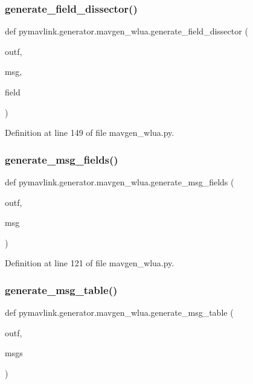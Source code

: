\subsubsection{\texorpdfstring{generate\_field\_dissector()}{generate\_field\_dissector()}}
{\footnotesize\ttfamily def pymavlink.\+generator.\+mavgen\+\_\+wlua.\+generate\+\_\+field\+\_\+dissector (\begin{DoxyParamCaption}\item[{}]{outf,  }\item[{}]{msg,  }\item[{}]{field }\end{DoxyParamCaption})}



Definition at line 149 of file mavgen\+\_\+wlua.\+py.

\mbox{\label{namespacepymavlink_1_1generator_1_1mavgen__wlua_a5a9d333c1ab8267705564a52bc232871}} 
\subsubsection{\texorpdfstring{generate\_msg\_fields()}{generate\_msg\_fields()}}
{\footnotesize\ttfamily def pymavlink.\+generator.\+mavgen\+\_\+wlua.\+generate\+\_\+msg\+\_\+fields (\begin{DoxyParamCaption}\item[{}]{outf,  }\item[{}]{msg }\end{DoxyParamCaption})}



Definition at line 121 of file mavgen\+\_\+wlua.\+py.

\mbox{\label{namespacepymavlink_1_1generator_1_1mavgen__wlua_aab77022f5146a6676fe580ef01a92f92}} 
\subsubsection{\texorpdfstring{generate\_msg\_table()}{generate\_msg\_table()}}
{\footnotesize\ttfamily def pymavlink.\+generator.\+mavgen\+\_\+wlua.\+generate\+\_\+msg\+\_\+table (\begin{DoxyParamCaption}\item[{}]{outf,  }\item[{}]{msgs }\end{DoxyParamCaption})}




